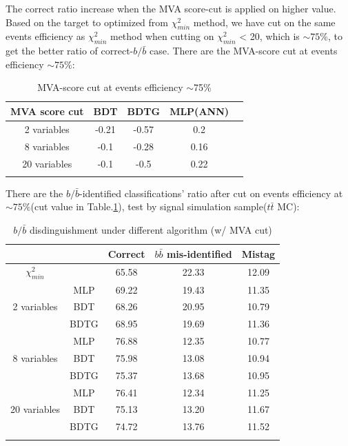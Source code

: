		The correct ratio increase when the MVA score-cut is applied on higher value. Based on the target to optimized from $\chi^2_{min}$ method, we have cut on the same events efficiency as $\chi^2_{min}$ method when cutting on $\chi^2_{min}$ < 20, which is $\sim$$75\%$, to get the better ratio of correct-$b/\bar{b}$ case. There are the MVA-score cut at events efficiency $\sim$$75\%$:

		\begin{center}
		\begin{longtable}[H]{ c c c c c }
		\caption{MVA-score cut at events efficiency $\sim$75\%}\\
		\hline
		MVA score cut & BDT & BDTG & MLP(ANN)  \\ 
		\hline{}
		2 variables & -0.21 & -0.57 & 0.2 \\
		8 variables & -0.1 & -0.28 & 0.16 \\
		20 variables & -0.1 & -0.5 & 0.22 \\
		\hline
		\label{EventSelReco:tb:algocut_value}
		\end{longtable}
		\end{center}

		There are the $b/\bar{b}$-identified classifications' ratio after cut on events efficiency at $\sim 75\%$(cut value in Table.\ref{EventSelReco:tb:algocut_value}), test by signal simulation sample($t\bar{t}$ MC):

		\begin{center}
		\begin{longtable}[H]{ c c | c c c }
		\caption{$b/\bar{b}$ disdinguishment under different algorithm (w/ MVA cut)}\\
		\hline
		[\%] & & Correct & $b\bar{b}$ mis-identified & Mistag  \\ 
		\hline
		$\chi^2_{min}$ & & 65.58 & 22.33 & 12.09 \\
		\hline
		\multirow{3}{5em}{2 variables} & MLP & 69.22 & 19.43 & 11.35 \\
		& BDT & 68.26 & 20.95 & 10.79 \\
		& BDTG & 68.95 & 19.69 & 11.36 \\
		\hline
		\multirow{3}{5em}{8 variables} & MLP & 76.88 & 12.35 & 10.77 \\
		& BDT & 75.98 & 13.08 & 10.94 \\
		& BDTG & 75.37 & 13.68 & 10.95 \\
		\hline
		\multirow{3}{5em}{20 variables} & MLP & 76.41 & 12.34 & 11.25 \\
		& BDT & 75.13 & 13.20 & 11.67 \\
		& BDTG & 74.72 & 13.76 & 11.52 \\
		\hline
		\label{EventSelReco:tb:algocut_bbsep}
		\end{longtable}
		\end{center}

